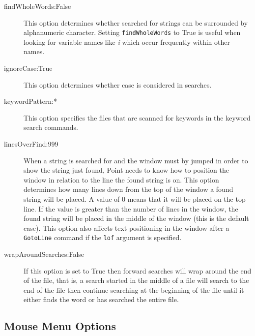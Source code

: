 \begin{description}

\item[findWholeWords:False]
This option determines whether searched for strings can be surrounded
by alphanumeric character.
Setting {\tt findWholeWords} to True is useful when looking for variable
names like {\it i} which occur frequently within other names.

\item[ignoreCase:True]
This option determines whether case is considered in searches.

\item[keywordPattern:*]
This option specifies the files that are scanned for keywords in the
keyword search commands.

\item[linesOverFind:999]
When a string is searched for and the window must by jumped in
order to show the string just found,
Point needs to know how to position the window
in relation to the line the found string is on.
This option determines how many lines down from the top of the
window a found string will be placed.
A value of 0 means that it will be placed on the top line.
If the value is greater than the number of lines in the window,
the found string will be placed in the middle of the window
(this is the default case).
This option also affects text positioning in the window after a
{\tt GotoLine} command if the {\tt lof} argument is specified.

\item[wrapAroundSearches:False]
If this option is set to True then forward searches will
wrap around the end of the file, that is,
a search started in the middle of a file will search
to the end of the file then continue searching at the
beginning of the file until it either finds the word
or has searched the entire file.

\end{description}



\subsection{Mouse Menu Options}


